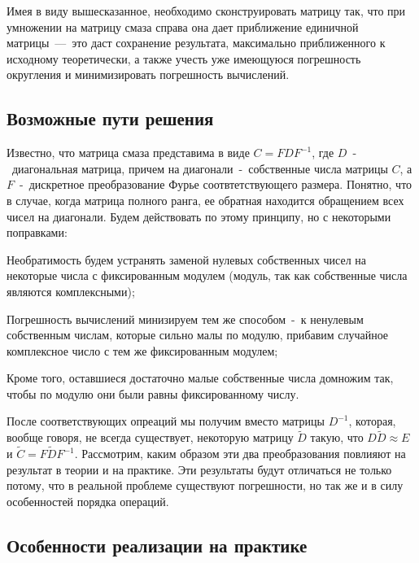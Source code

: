 \documentclass[a4paper]{article}
\theoremstyle{definition}
\newcounter{qcounter}
\begin{document}
    Имея в виду вышесказанное, необходимо сконструировать матрицу так, что при умножении на матрицу смаза справа она дает приближение единичной матрицы~---~это даст сохранение результата, максимально приближенного к исходному теоретически, а также учесть уже имеющуюся погрешность округления и минимизировать погрешность вычислений.


    \subsection{Возможные пути решения}


    Известно, что матрица смаза представима в виде $C = FDF^{-1}$, где $D$~-~диагональная матрица, причем на диагонали~-~собственные числа матрицы $C$, а $F$~-~дискретное преобразование Фурье соотвтетствующего размера. Понятно, что в случае, когда матрица полного ранга, ее обратная находится обращением всех чисел на диагонали. Будем действовать по этому принципу, но с некоторыми поправками:


    \begin{list}{)~}{}
        \item Необратимость будем устранять заменой нулевых собственных чисел на некоторые числа с фиксированным модулем (модуль, так как собственные числа являются комплексными);
        \item Погрешность вычислений минизируем тем же способом~-~к ненулевым собственным числам, которые сильно малы по модулю, прибавим случайное комплексное число с тем же фиксированным модулем;
        \item Кроме того, оставшиеся достаточно малые собственные числа домножим так, чтобы по модулю они были равны фиксированному числу.
    \end{list}



    После соответствующих опреаций мы получим вместо матрицы $D^{-1}$, которая, вообще говоря, не всегда существует, некоторую матрицу $\tilde{D}$ такую, что $D\tilde{D} \approx E$ и $\tilde{C} = F\tilde{D}F^{-1}$. Рассмотрим, каким образом эти два преобразования повлияют на результат в теории и на практике. Эти результаты будут отличаться не только потому, что в реальной проблеме существуют погрешности, но так же и в силу особенностей порядка операций.


    \subsection{Особенности реализации на практике}
\end{document}
